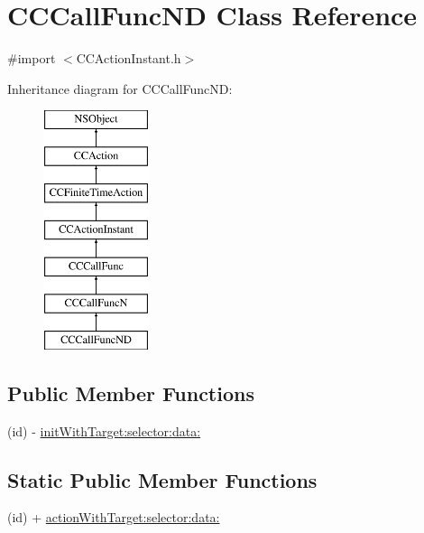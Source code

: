 \hypertarget{interface_c_c_call_func_n_d}{\section{C\-C\-Call\-Func\-N\-D Class Reference}
\label{interface_c_c_call_func_n_d}
}


{\ttfamily \#import $<$C\-C\-Action\-Instant.\-h$>$}

Inheritance diagram for C\-C\-Call\-Func\-N\-D\-:\begin{figure}[H]
\begin{center}
\leavevmode
\includegraphics[height=7.000000cm]{interface_c_c_call_func_n_d}
\end{center}
\end{figure}
\subsection*{Public Member Functions}
\begin{DoxyCompactItemize}
\item 
(id) -\/ \hyperlink{interface_c_c_call_func_n_d_a5168ae06674520c5769d24ee8618e793}{init\-With\-Target\-:selector\-:data\-:}
\end{DoxyCompactItemize}
\subsection*{Static Public Member Functions}
\begin{DoxyCompactItemize}
\item 
(id) + \hyperlink{interface_c_c_call_func_n_d_a7a11c02c792394d63b4a5c42c1cf6cdb}{action\-With\-Target\-:selector\-:data\-:}
\end{DoxyCompactItemize}
